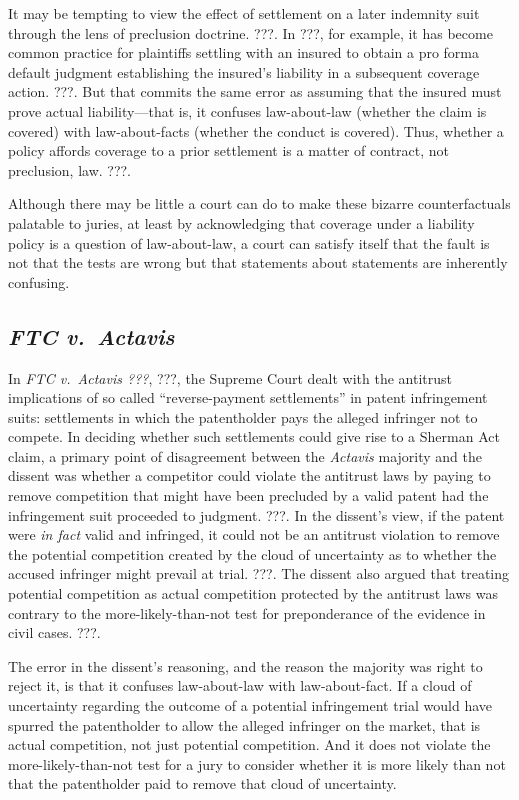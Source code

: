 \documentclass[
  12pt,
  letterpaper,
]{scrartcl}
\begin{document}
It may be tempting to view the effect of settlement on a later indemnity suit
through the lens of preclusion doctrine. ???. In ???, for example, it has
become common practice for plaintiffs settling with an insured to obtain a pro
forma default judgment establishing the insured's liability in a subsequent
coverage action. ???. But that commits the same error as assuming that the
insured must prove actual liability---that is, it confuses law-about-law
(whether the claim is covered) with law-about-facts (whether the conduct is
covered). Thus, whether a policy affords coverage to a prior settlement is a
matter of contract, not preclusion, law. ???.

Although there may be little a court can do to make these bizarre
counterfactuals palatable to juries, at least by acknowledging that coverage
under a liability policy is a question of law-about-law, a court can satisfy
itself that the fault is not that the tests are wrong but that statements about
statements are inherently confusing.


\subsection{\textit{FTC v.~Actavis}}

In \textit{FTC v.~Actavis ???}, ???, the Supreme Court dealt with the antitrust
implications of so called ``reverse-payment settlements'' in patent
infringement suits: settlements in which the patentholder pays the alleged
infringer not to compete. In deciding whether such settlements could give rise
to a Sherman Act claim, a primary point of disagreement between the
\textit{Actavis} majority and the dissent was whether a competitor could
violate the antitrust laws by paying to remove competition that might have been
precluded by a valid patent had the infringement suit proceeded to judgment.
???. In the dissent's view, if the patent were \emph{in fact} valid and
infringed, it could not be an antitrust violation to remove the potential
competition created by the cloud of uncertainty as to whether the accused
infringer might prevail at trial. ???. The dissent also argued that treating
potential competition as actual competition protected by the antitrust laws
was contrary to the more-likely-than-not test for preponderance of the evidence
in civil cases. ???.

The error in the dissent's reasoning, and the reason the majority was right to
reject it, is that it confuses law-about-law with law-about-fact. If a cloud of
uncertainty regarding the outcome of a potential infringement trial would have
spurred the patentholder to allow the alleged infringer on the market, that is
actual competition, not just potential competition. And it does not violate the
more-likely-than-not test for a jury to consider whether it is more likely than
not that the patentholder paid to remove that cloud of uncertainty.
\end{document}

